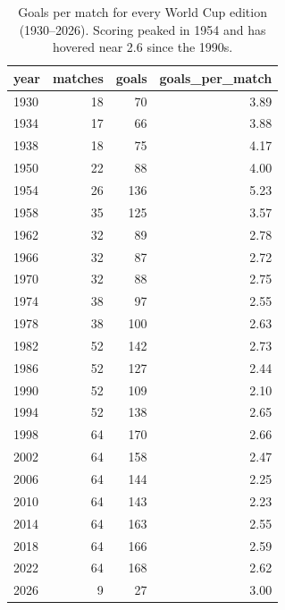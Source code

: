 \begin{table}[t]
  \centering
  \caption{Goals per match for every World Cup edition (1930–2026). Scoring peaked in 1954 and has hovered near 2.6 since the 1990s.}
  \label{tab:wcgoals}
  \begin{tabular}{lrrr}
  \toprule
  year & matches & goals & goals\_per\_match \\
  \midrule
  1930 & 18 & 70 & 3.89 \\
  1934 & 17 & 66 & 3.88 \\
  1938 & 18 & 75 & 4.17 \\
  1950 & 22 & 88 & 4.00 \\
  1954 & 26 & 136 & 5.23 \\
  1958 & 35 & 125 & 3.57 \\
  1962 & 32 & 89 & 2.78 \\
  1966 & 32 & 87 & 2.72 \\
  1970 & 32 & 88 & 2.75 \\
  1974 & 38 & 97 & 2.55 \\
  1978 & 38 & 100 & 2.63 \\
  1982 & 52 & 142 & 2.73 \\
  1986 & 52 & 127 & 2.44 \\
  1990 & 52 & 109 & 2.10 \\
  1994 & 52 & 138 & 2.65 \\
  1998 & 64 & 170 & 2.66 \\
  2002 & 64 & 158 & 2.47 \\
  2006 & 64 & 144 & 2.25 \\
  2010 & 64 & 143 & 2.23 \\
  2014 & 64 & 163 & 2.55 \\
  2018 & 64 & 166 & 2.59 \\
  2022 & 64 & 168 & 2.62 \\
  2026 & 9 & 27 & 3.00 \\
  \bottomrule
  \end{tabular}
\end{table}
